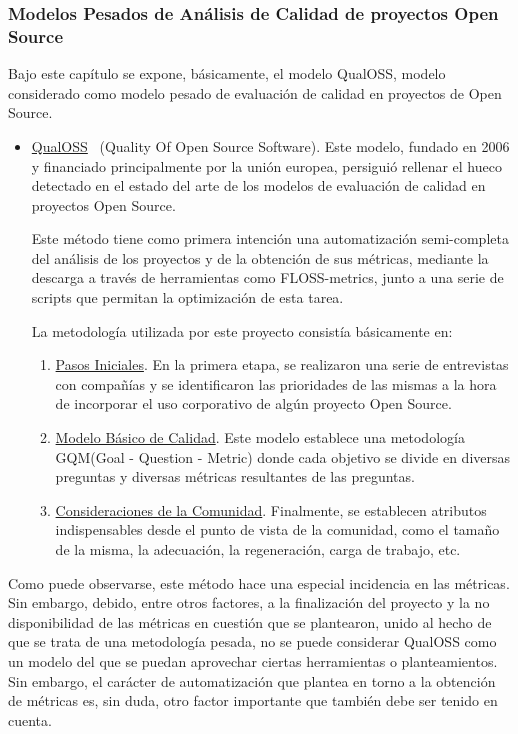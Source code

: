 \documentclass[11pt]{article}
\begin{document}
\subsubsection{Modelos Pesados de Análisis de Calidad de proyectos Open Source}

Bajo este capítulo se expone, básicamente, el modelo QualOSS, modelo considerado como modelo pesado de evaluación de calidad en proyectos de Open Source.
\begin{itemize}
\item{\underline{QualOSS}~\cite{qualoss:qualoss} (Quality Of Open Source Software)}. Este modelo, fundado en 2006 y financiado principalmente por la unión europea, persiguió rellenar el hueco detectado en el estado del arte de los modelos de evaluación de calidad en proyectos Open Source.

Este método tiene como primera intención una automatización semi-completa del análisis de los proyectos y de la obtención de sus métricas, mediante la descarga a través de herramientas como FLOSS-metrics, junto a una serie de scripts que permitan la optimización de esta tarea.

La metodología utilizada por este proyecto consistía básicamente en:
\begin{enumerate}
\item{\underline{Pasos Iniciales}}. En la primera etapa, se realizaron una serie de entrevistas con compañías y se identificaron las prioridades de las mismas a la hora de incorporar el uso corporativo de algún proyecto Open Source.
\item{\underline{Modelo Básico de Calidad}}. Este modelo establece una metodología GQM(Goal - Question - Metric) donde cada objetivo se divide en diversas preguntas y diversas métricas resultantes de las preguntas.
\item{\underline{Consideraciones de la Comunidad}}. Finalmente, se establecen atributos indispensables desde el punto de vista de la comunidad, como el tamaño de la misma, la adecuación, la regeneración, carga de trabajo, etc.
\end{enumerate}
\end{itemize}

Como puede observarse, este método hace una especial incidencia en las métricas. Sin embargo, debido, entre otros factores, a la finalización del proyecto y la no disponibilidad de las métricas en cuestión que se plantearon, unido al hecho de que se trata de una metodología pesada, no se puede considerar QualOSS como un modelo del que se puedan aprovechar ciertas herramientas o planteamientos. Sin embargo, el carácter de automatización que plantea en torno a la obtención de métricas es, sin duda, otro factor importante que también debe ser tenido en cuenta. 
\end{document}
